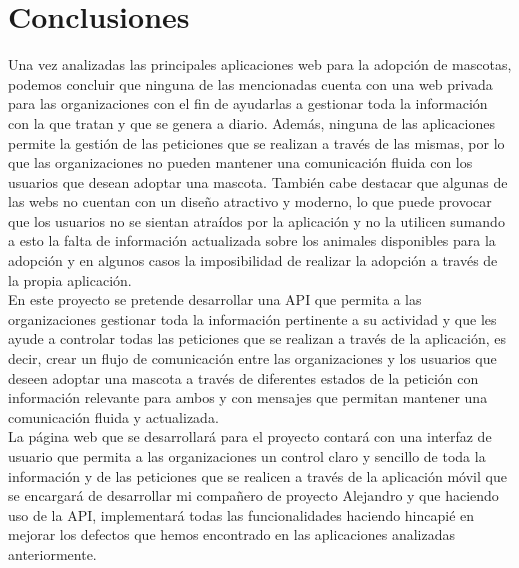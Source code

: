 \section{Conclusiones}\label{sec:conclusiones-estado-del-arte}

Una vez analizadas las principales aplicaciones web para la adopción de mascotas, podemos concluir que ninguna de las
mencionadas cuenta con una web privada para las organizaciones con el fin de ayudarlas a gestionar
toda la información con la que tratan y que se genera a diario. Además, ninguna de las aplicaciones permite la
gestión de las peticiones que se realizan a través de las mismas, por lo que las organizaciones no pueden mantener
una comunicación fluida con los usuarios que desean adoptar una mascota. También cabe destacar que algunas de las
webs no cuentan con un diseño atractivo y moderno, lo que puede provocar que los usuarios no se sientan atraídos
por la aplicación y no la utilicen sumando a esto la falta de información actualizada sobre los animales disponibles
para la adopción y en algunos casos la imposibilidad de realizar la adopción a través de la propia aplicación. \\

En este proyecto se pretende desarrollar una API que permita a las organizaciones gestionar toda la información
pertinente a su actividad y que les ayude a controlar todas las peticiones que se realizan a través de la aplicación, es
decir, crear un flujo de comunicación entre las organizaciones y los usuarios que deseen adoptar una mascota a través
de diferentes estados de la petición con información relevante para ambos y con mensajes que permitan mantener
una comunicación fluida y actualizada. \\

La página web que se desarrollará para el proyecto contará con una interfaz de usuario que permita a las organizaciones
un control claro y sencillo de toda la información y de las peticiones que se realicen a través de la aplicación móvil
que se encargará de desarrollar mi compañero de proyecto Alejandro y que haciendo uso de la API, implementará todas
las funcionalidades haciendo hincapié en mejorar los defectos que hemos encontrado en las aplicaciones analizadas
anteriormente. \\